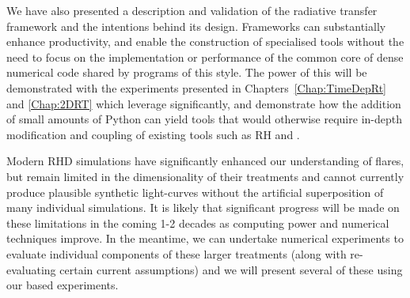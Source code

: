 We have also presented a description and validation of the \Lw{} radiative transfer framework and the intentions behind its design.
Frameworks can substantially enhance productivity, and enable the construction of specialised tools without the need to focus on the implementation or performance of the common core of dense numerical code shared by programs of this style.
The power of this will be demonstrated with the experiments presented in Chapters~\ref{Chap:TimeDepRt} and \ref{Chap:2DRT} which leverage \Lw{} significantly, and demonstrate how the addition of small amounts of Python can yield tools that would otherwise require in-depth modification and coupling of existing tools such as RH and \Radyn{}.

Modern RHD simulations have significantly enhanced our understanding of flares, but remain limited in the dimensionality of their treatments and cannot currently produce plausible synthetic light-curves without the artificial superposition of many individual simulations.
It is likely that significant progress will be made on these limitations in the coming 1-2 decades as computing power and numerical techniques improve.
In the meantime, we can undertake numerical experiments to evaluate individual components of these larger treatments (along with re-evaluating certain current assumptions) and we will present several of these using our \Lw{} based experiments.
